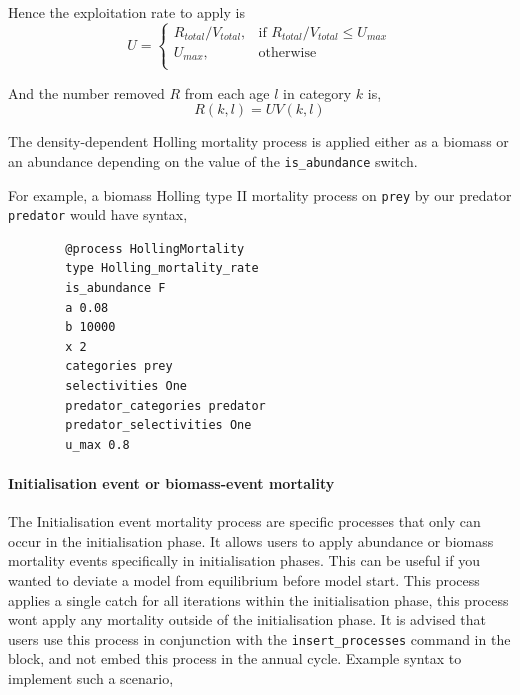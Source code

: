 Hence the exploitation rate to apply is 
\begin{equation}
	U = \begin{cases}
		R_{total}/V_{total}, & \text{if $R_{total}/V_{total} \leq U_{max}$} \\
		U_{max}, & \text{otherwise}\\ 
	\end{cases} 
\end{equation}

And the number removed $R$ from each age $l$ in category $k$ is,
\begin{equation}
	R(k,l) = UV(k,l)
\end{equation}

The density-dependent Holling mortality process is applied either as a biomass or an abundance depending on the value of the \texttt{is\_abundance} switch.

For example, a biomass Holling type II mortality process on \texttt{prey} by our predator \texttt{predator} would have syntax,

{\small{\begin{verbatim}
		@process HollingMortality
		type Holling_mortality_rate
		is_abundance F
		a 0.08
		b 10000
		x 2
		categories prey
		selectivities One
		predator_categories predator
		predator_selectivities One
		u_max 0.8
		\end{verbatim}}}

\paragraph{Initialisation event or biomass-event mortality}

The Initialisation event mortality process are specific processes that only can occur in the initialisation phase. It allows users to apply abundance or biomass mortality events specifically in initialisation phases. This can be useful if you wanted to deviate a model from equilibrium before model start. This process applies a single catch for all iterations within the initialisation phase, this process wont apply any mortality outside of the initialisation phase. It is advised that users use this process in conjunction with the \texttt{insert\_processes} command in the  block, and not embed this process in the annual cycle. Example syntax to implement such a scenario,

